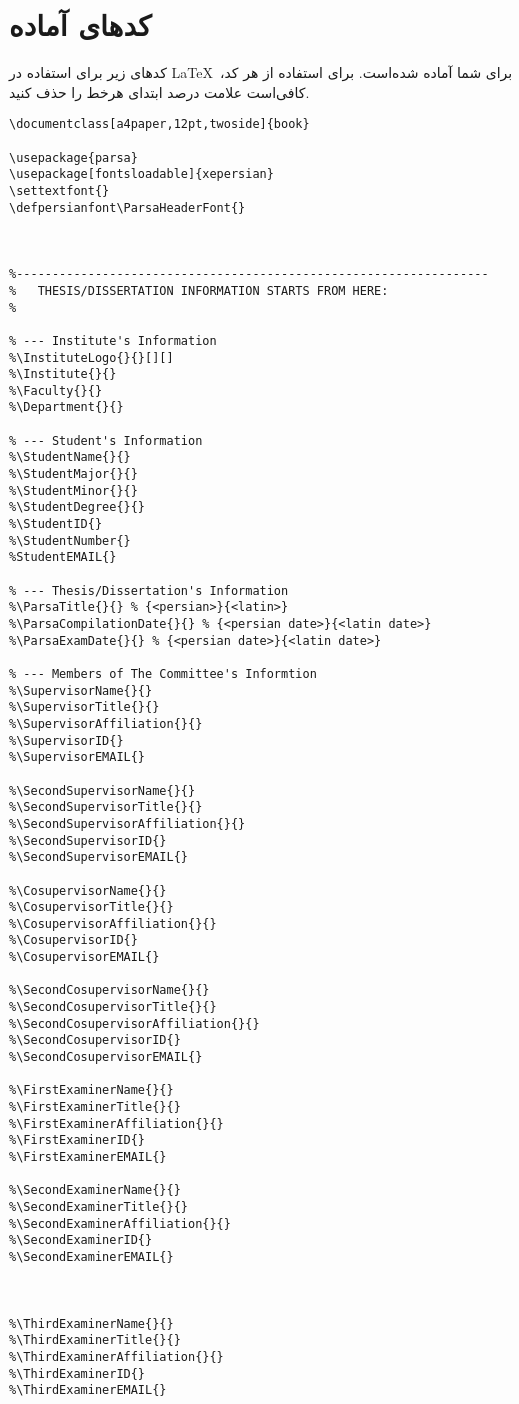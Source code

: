 \documentclass[%
12pt,%
twoside, %
openany, %
notitlepage,%
fleqn,%
]{article}
\numberwithin{equation}{section} %
\begin{document}
\section{کدهای آماده}
کدهای زیر برای استفاده در \LaTeX ~برای شما آماده شده‌است. برای استفاده از هر کد، کافی‌است علامت درصد ابتدای هرخط را حذف کنید.
\begin{latin} \begin{verbatim}
\documentclass[a4paper,12pt,twoside]{book}

\usepackage{parsa}
\usepackage[fontsloadable]{xepersian}
\settextfont{} 
\defpersianfont\ParsaHeaderFont{} 



%------------------------------------------------------------------
%	THESIS/DISSERTATION INFORMATION STARTS FROM HERE:
%

% --- Institute's Information
%\InstituteLogo{}{}[][] 
%\Institute{}{}
%\Faculty{}{}
%\Department{}{} 

% --- Student's Information
%\StudentName{}{} 
%\StudentMajor{}{}
%\StudentMinor{}{}
%\StudentDegree{}{}
%\StudentID{}
%\StudentNumber{}
%StudentEMAIL{}

% --- Thesis/Dissertation's Information
%\ParsaTitle{}{} % {<persian>}{<latin>}
%\ParsaCompilationDate{}{} % {<persian date>}{<latin date>}
%\ParsaExamDate{}{} % {<persian date>}{<latin date>}

% --- Members of The Committee's Informtion
%\SupervisorName{}{} 
%\SupervisorTitle{}{}
%\SupervisorAffiliation{}{}
%\SupervisorID{}
%\SupervisorEMAIL{}

%\SecondSupervisorName{}{}
%\SecondSupervisorTitle{}{}
%\SecondSupervisorAffiliation{}{}
%\SecondSupervisorID{}
%\SecondSupervisorEMAIL{}

%\CosupervisorName{}{}
%\CosupervisorTitle{}{}
%\CosupervisorAffiliation{}{}
%\CosupervisorID{}
%\CosupervisorEMAIL{}

%\SecondCosupervisorName{}{}
%\SecondCosupervisorTitle{}{}
%\SecondCosupervisorAffiliation{}{}
%\SecondCosupervisorID{}
%\SecondCosupervisorEMAIL{}

%\FirstExaminerName{}{}
%\FirstExaminerTitle{}{}
%\FirstExaminerAffiliation{}{}
%\FirstExaminerID{}
%\FirstExaminerEMAIL{}

%\SecondExaminerName{}{}
%\SecondExaminerTitle{}{}
%\SecondExaminerAffiliation{}{}
%\SecondExaminerID{}
%\SecondExaminerEMAIL{}



%\ThirdExaminerName{}{}
%\ThirdExaminerTitle{}{}
%\ThirdExaminerAffiliation{}{}
%\ThirdExaminerID{}
%\ThirdExaminerEMAIL{}


\end{verbatim}
\end{latin}
\end{document}
